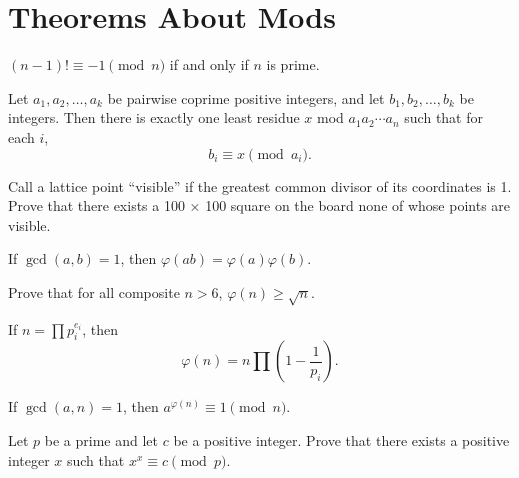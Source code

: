 \section{Theorems About Mods}
\begin{result}{\label{r:n:n:t:1}}
  $(n-1)!\equiv -1\pmod n$ if and only if $n$ is prime.
\end{result}
\begin{result}{\label{r:n:n:t:2}}
    Let $a_1,a_2,\ldots,a_k$ be pairwise coprime positive integers, and let
    $b_1,b_2,\ldots,b_k$ be integers. Then there is exactly one least
    residue $x$ mod $a_1a_2\cdots a_n$ such that for each $i$,
    \[b_i\equiv x\pmod {a_i}.\]
\end{result}
\begin{problem}{\label{p:n:n:t:1}}
    Call a lattice point ``visible'' if the greatest
    common divisor of its coordinates is 1. Prove that there exists a 100 × 100
    square on the board none of whose points are visible.
\end{problem}
\begin{result}{\label{r:n:n:t:3}}
    If $\gcd(a,b)=1$, then $\varphi(ab)=\varphi(a)\varphi(b)$.
\end{result}
\begin{problem}{\label{p:n:n:t:2}}
    Prove that for all composite $n>6$, $\varphi(n)\ge\sqrt n$.
\end{problem}
\begin{result}{\label{r:n:n:t:4}}
    If $n=\prod p_i^{e_i}$, then
    \[\varphi(n)=n\prod\left(1-\frac 1{p_i}\right).\]
\end{result}
\begin{result}{\label{r:n:n:t:5}}
    If $\gcd(a,n)=1$, then $a^{\varphi(n)}\equiv 1\pmod n$.
\end{result}
\begin{problem}{\label{p:n:n:t:3}}
  Let $p$ be a prime and let $c$ be a positive integer. Prove that there
    exists a positive integer $x$ such that $x^x\equiv c\pmod p$.
\end{problem}
